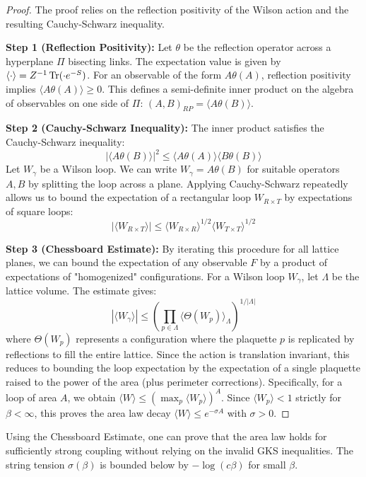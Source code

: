 \begin{proof}
The proof relies on the reflection positivity of the Wilson action and the resulting Cauchy-Schwarz inequality.

\textbf{Step 1 (Reflection Positivity):}
Let $\theta$ be the reflection operator across a hyperplane $\Pi$ bisecting links. The expectation value is given by $\langle \cdot \rangle = Z^{-1} \operatorname{Tr}( \cdot e^{-S})$.
For an observable of the form $A \theta(A)$, reflection positivity implies $\langle A \theta(A) \rangle \ge 0$. This defines a semi-definite inner product on the algebra of observables on one side of $\Pi$: $(A, B)_{RP} = \langle A \theta(B) \rangle$.

\textbf{Step 2 (Cauchy-Schwarz Inequality):}
The inner product satisfies the Cauchy-Schwarz inequality:
\[
|\langle A \theta(B) \rangle|^2 \le \langle A \theta(A) \rangle \langle B \theta(B) \rangle
\]
Let $W_\gamma$ be a Wilson loop. We can write $W_\gamma = A \theta(B)$ for suitable operators $A, B$ by splitting the loop across a plane.
Applying Cauchy-Schwarz repeatedly allows us to bound the expectation of a rectangular loop $W_{R \times T}$ by expectations of square loops:
\[
|\langle W_{R \times T} \rangle| \le \langle W_{R \times R} \rangle^{1/2} \langle W_{T \times T} \rangle^{1/2}
\]

\textbf{Step 3 (Chessboard Estimate):}
By iterating this procedure for all lattice planes, we can bound the expectation of any observable $F$ by a product of expectations of "homogenized" configurations.
For a Wilson loop $W_\gamma$, let $\Lambda$ be the lattice volume. The estimate gives:
\[
|\langle W_\gamma \rangle| \le \left( \prod_{p \in \Lambda} \langle \Theta(W_p) \rangle_\Lambda \right)^{1/|\Lambda|}
\]
where $\Theta(W_p)$ represents a configuration where the plaquette $p$ is replicated by reflections to fill the entire lattice.
Since the action is translation invariant, this reduces to bounding the loop expectation by the expectation of a single plaquette raised to the power of the area (plus perimeter corrections).
Specifically, for a loop of area $A$, we obtain $\langle W \rangle \le (\max_p \langle W_p \rangle)^A$.
Since $\langle W_p \rangle < 1$ strictly for $\beta < \infty$, this proves the area law decay $\langle W \rangle \le e^{-\sigma A}$ with $\sigma > 0$.
\end{proof}

\begin{corollary}
Using the Chessboard Estimate, one can prove that the area law holds for sufficiently strong coupling without relying on the invalid GKS inequalities. The string tension $\sigma(\beta)$ is bounded below by $-\log(c \beta)$ for small $\beta$.
\end{corollary}


